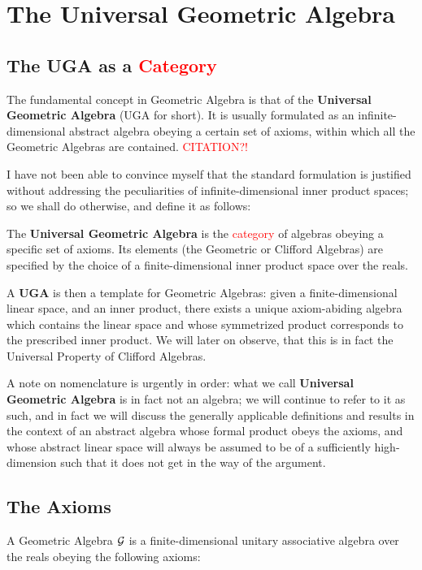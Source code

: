 \section{The Universal Geometric Algebra}
\subsection{The UGA as a \textcolor{red}{Category}}

The fundamental concept in Geometric Algebra is that of the \textbf{Universal Geometric Algebra} (UGA for short). It is usually formulated as an infinite-dimensional abstract algebra obeying a certain set of axioms, within which all the Geometric Algebras are contained. \textcolor{red}{CITATION?!}

I have not been able to convince myself that the standard formulation is justified without addressing the peculiarities of infinite-dimensional inner product spaces; so we shall do otherwise, and define it as follows:
\begin{definition}
	The \textbf{Universal Geometric Algebra} is the \textcolor{red}{category} of algebras obeying a specific set of axioms. Its elements (the Geometric or Clifford Algebras) are specified by the choice of a finite-dimensional inner product space over the reals.
\end{definition}

A \textbf{UGA} is then a template for Geometric Algebras: given a finite-dimensional linear space, and an inner product, there exists a unique axiom-abiding algebra which contains the linear space and whose symmetrized product corresponds to the prescribed inner product. We will later on observe, that this is in fact the Universal Property of Clifford Algebras.

A note on nomenclature is urgently in order: what we call \textbf{Universal Geometric Algebra} is in fact not an algebra; we will continue to refer to it as such, and in fact we will discuss the generally applicable definitions and results in the context of an abstract algebra whose formal product obeys the axioms, and whose abstract linear space will always be assumed to be of a sufficiently high-dimension such that it does not get in the way of the argument.

\subsection{The Axioms}

A Geometric Algebra $\mathcal{G}$  is a finite-dimensional unitary associative algebra over the reals obeying the following axioms:


